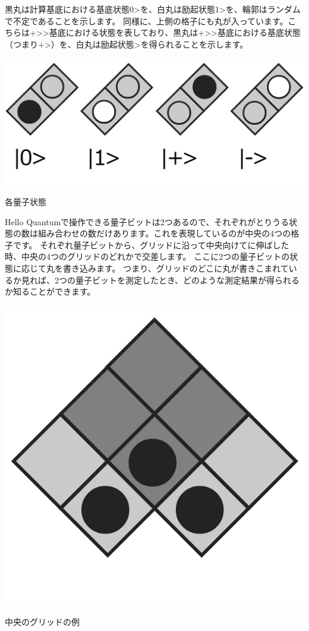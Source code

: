 黒丸は計算基底における基底状態\textbar{}0\textgreater{}を、白丸は励起状態\textbar{}1\textgreater{}を、輪郭はランダムで不定であることを示します。
同様に、上側の格子にも丸が入っています。こちらは\textbar{}+\textgreater{}\textbar{}{-}\textgreater{}基底における状態を表しており、黒丸は\textbar{}+\textgreater{}\textbar{}{-}\textgreater{}基底における基底状態（つまり\textbar{}+\textgreater{}）を、白丸は励起状態\textbar{}{-}\textgreater{}を得られることを示します。

\begin{reviewimage}
\includegraphics[width=0.75\maxwidth]{./images/image2.png}
\caption{各量子状態}
\label{image:01:image2}
\end{reviewimage}

Hello Quantumで操作できる量子ビットは2つあるので、それぞれがとりうる状態の数は組み合わせの数だけあります。これを表現しているのが中央の4つの格子です。
それぞれ量子ビットから、グリッドに沿って中央向けてに伸ばした時、中央の4つのグリッドのどれかで交差します。
ここに2つの量子ビットの状態に応じて丸を書き込みます。
つまり、グリッドのどこに丸が書きこまれているか見れば、2つの量子ビットを測定したとき、どのような測定結果が得られるか知ることができます。

\begin{reviewimage}
\includegraphics[width=0.5\maxwidth]{./images/image4.png}
\caption{中央のグリッドの例}
\label{image:01:image4}
\end{reviewimage}

